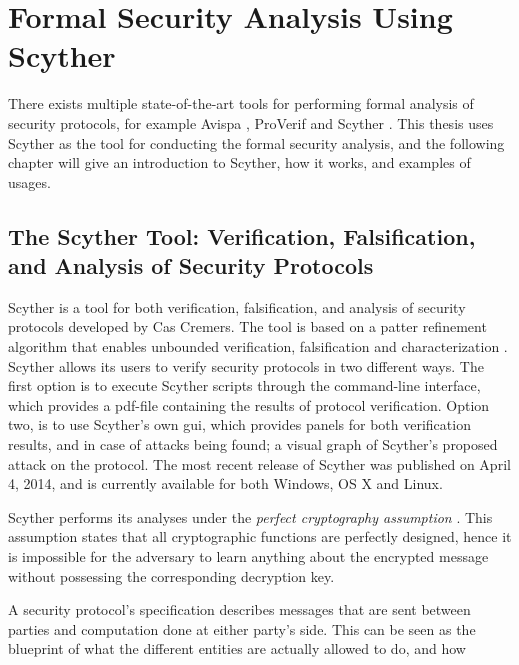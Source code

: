 \chapter{Formal Security Analysis Using Scyther}
\label{chp:scyther} 


There exists multiple state-of-the-art tools for performing formal analysis of security protocols, for example Avispa \cite{avispa}, ProVerif \cite{proverif} and Scyther \cite{scyther}. This thesis uses Scyther as the tool for conducting the formal security analysis, and the following chapter will give an introduction to Scyther, how it works, and examples of usages.


\section{The Scyther Tool: Verification, Falsification, and Analysis of Security Protocols}

Scyther is a tool for both verification, falsification, and analysis of security protocols developed by Cas Cremers. The tool is based on a patter refinement algorithm that enables unbounded verification, falsification and characterization \cite{cremers2008scyther}. Scyther allows its users to verify security protocols in two different ways. The first option is to execute Scyther scripts through the command-line interface, which provides a pdf-file containing the results of protocol verification. Option two, is to use Scyther's own \gls{gui}, which provides panels for both verification results, and in case of attacks being found; a visual graph of Scyther's proposed attack on the protocol. The most recent release of Scyther was published on April 4, 2014, and is currently available for both Windows, OS X and Linux.


Scyther performs its analyses under the \emph{perfect cryptography assumption} \cite{cremers2008unbounded}. This assumption states that all cryptographic functions are perfectly designed, hence it is impossible for the adversary to learn anything about the encrypted message without possessing the corresponding decryption key.


A security protocol's specification describes messages that are sent between parties and computation done at either party's side. This can be seen as the blueprint of what the different entities are actually allowed to do, and how  


